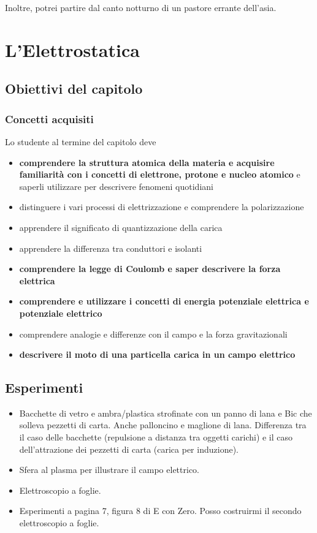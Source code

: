 \documentclass[11pt]{report}
\begin{document}
Inoltre, potrei partire dal canto notturno di un pastore errante dell'asia.

\chapter{L'Elettrostatica}

\section*{Obiettivi del capitolo}

\subsection*{Concetti acquisiti}

Lo studente al termine del capitolo deve
\begin{itemize}
    \item \textbf{comprendere la struttura atomica della materia e acquisire familiarità con i concetti di elettrone, protone e nucleo atomico} e saperli utilizzare per descrivere fenomeni quotidiani
    \item distinguere i vari processi di elettrizzazione e comprendere la polarizzazione
    \item apprendere il significato di quantizzazione della carica
    \item apprendere la differenza tra conduttori e isolanti
    \item \textbf{comprendere la legge di Coulomb e saper descrivere la forza elettrica}
    \item \textbf{comprendere e utilizzare i concetti di energia potenziale elettrica e potenziale elettrico}
    \item comprendere analogie e differenze con il campo e la forza gravitazionali
    \item \textbf{descrivere il moto di una particella carica in un campo elettrico}
\end{itemize}

\section*{Esperimenti}
\begin{itemize}
    \item Bacchette di vetro e ambra/plastica strofinate con un panno di lana e Bic che solleva pezzetti di carta. Anche palloncino e maglione di lana. Differenza tra il caso delle bacchette (repulsione a distanza tra oggetti carichi) e il caso dell'attrazione dei pezzetti di carta (carica per induzione).
    \item Sfera al plasma per illustrare il campo elettrico.
    \item Elettroscopio a foglie.
    \item Esperimenti a pagina 7, figura 8 di E con Zero. Posso costruirmi il secondo elettroscopio a foglie.
\end{itemize}
\end{document}
